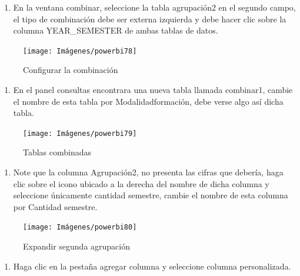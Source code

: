 \documentclass[
]{book}
\providecommand{\tightlist}{%
  \setlength{\itemsep}{0pt}\setlength{\parskip}{0pt}}
\begin{document}
\begin{enumerate}
\def\labelenumi{\arabic{enumi}.}
\setcounter{enumi}{8}
\tightlist
\item
  En la ventana combinar, seleccione la tabla agrupación2 en el segundo campo, el tipo de combinación debe ser externa izquierda y debe hacer clic sobre la columna YEAR\_SEMESTER de ambas tablas de datos.
\end{enumerate}

\begin{figure}

{\centering \texttt{[image: Imágenes/powerbi78]} 

}

\caption{Configurar la combinación}\label{fig:paso9porcentajes-fig}
\end{figure}

\begin{enumerate}
\def\labelenumi{\arabic{enumi}.}
\setcounter{enumi}{9}
\tightlist
\item
  En el panel consultas encontrara una nueva tabla llamada combinar1, cambie el nombre de esta tabla por Modalidadformación, debe verse algo así dicha tabla.
\end{enumerate}

\begin{figure}

{\centering \texttt{[image: Imágenes/powerbi79]} 

}

\caption{Tablas combinadas}\label{fig:paso10porcentajes-fig}
\end{figure}

\begin{enumerate}
\def\labelenumi{\arabic{enumi}.}
\setcounter{enumi}{10}
\tightlist
\item
  Note que la columna Agrupación2, no presenta las cifras que debería, haga clic sobre el icono ubicado a la derecha del nombre de dicha columna y seleccione únicamente cantidad semestre, cambie el nombre de esta columna por Cantidad semestre.
\end{enumerate}

\begin{figure}

{\centering \texttt{[image: Imágenes/powerbi80]} 

}

\caption{Expandir segunda agrupación}\label{fig:paso11porcentajes-fig}
\end{figure}

\begin{enumerate}
\def\labelenumi{\arabic{enumi}.}
\setcounter{enumi}{11}
\tightlist
\item
  Haga clic en la pestaña agregar columna y seleccione columna personalizada.
\end{enumerate}
\end{document}
